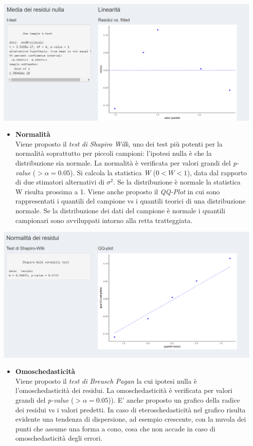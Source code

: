 \documentclass[
  11pt,
]{book}
\providecommand{\tightlist}{%
  \setlength{\itemsep}{0pt}\setlength{\parskip}{0pt}}
\begin{document}
\begin{center}\includegraphics[width=0.5\linewidth]{Immagini/Regressione/12_ipotesi1} \end{center}

\begin{itemize}
\tightlist
\item
  \textbf{Normalità}\\
  Viene proposto il \emph{test di Shapiro Wilk}, uno dei test più potenti per la normalità soprattutto per piccoli campioni: l'ipotesi nulla è che la distribuzione sia normale. La normalità è verificata per valori grandi del \emph{p-value} (\(> \alpha = 0.05\)). Si calcola la statistica \emph{W} (\(0<W<1\)), data dal rapporto di due stimatori alternativi di \(\sigma^2\). Se la distribuzione è normale la statistica W risulta prossima a 1. Viene anche proposto il \emph{QQ-Plot} in cui sono rappresentati i quantili del campione vs i quantili teorici di una distribuzione normale. Se la distribuzione dei dati del campione è normale i quantili campionari sono avviluppati intorno alla retta tratteggiata.
\end{itemize}

\begin{center}\includegraphics[width=0.5\linewidth]{Immagini/Regressione/13_ipotesi2} \end{center}

\begin{itemize}
\tightlist
\item
  \textbf{Omoschedasticità}\\
  Viene proposto il \emph{test di Breusch Pagan} la cui ipotesi nulla è l'omoschedasticità dei residui. La omoschedasticità è verificata per valori grandi del \emph{p-value} (\(>\alpha = 0.05\))). E' anche proposto un grafico della radice dei residui vs i valori predetti.
  In caso di eteroschedasticità nel grafico risulta evidente una tendenza di dispersione, ad esempio crescente, con la nuvola dei punti che assume una forma a cono, cosa che non accade in caso di omoschedasticità degli errori.
\end{itemize}
\end{document}
